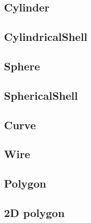 \subsection{Cylinder } \label{cylinder}


\subsection{CylindricalShell} \label{cylindershell}


\subsection{Sphere} \label{sphere}


\subsection{SphericalShell} \label{sphereshell}


\subsection{Curve} \label{curve}


\subsection{Wire} \label{wire}


\subsection{Polygon} \label{polygon}


\subsection{2D polygon} \label{2dpoly}


